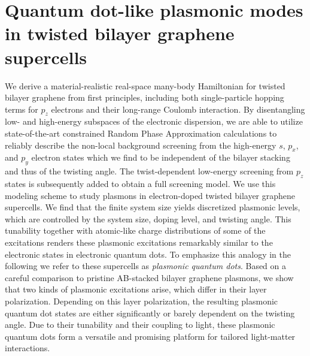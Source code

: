 \openleft%
\chapter[Quantum dot-like plasmonic modes in twisted bilayer graphene supercells][Quantum dot-like plasmonic modes in twisted bilayer graphene supercells]{Quantum dot-like plasmonic modes in twisted bilayer graphene supercells}\label{ch:mat22}


{\small We derive a material-realistic real-space many-body Hamiltonian for twisted bilayer graphene from first principles, including both single-particle hopping terms for $p_z$ electrons and their long-range Coulomb interaction. By disentangling low- and high-energy subspaces of the electronic dispersion, we are able to utilize state-of-the-art constrained Random Phase Approximation calculations to reliably describe the non-local background screening from the high-energy $s$, $p_x$, and $p_y$ electron states which we find to be independent of the bilayer stacking and thus of the twisting angle. The twist-dependent low-energy screening from $p_z$ states is subsequently added to obtain a full screening model.  We use this modeling scheme to study plasmons in electron-doped twisted bilayer graphene supercells. We find that the finite system size yields discretized plasmonic levels, which are controlled by the system size, doping level, and twisting angle. This tunability together with atomic-like charge distributions of some of the excitations renders these plasmonic excitations remarkably similar to the electronic states in electronic quantum dots. To emphasize this analogy in the following we refer to these supercells as \emph{plasmonic quantum dots}.  Based on a careful comparison to pristine AB-stacked bilayer graphene plasmons, we show that two kinds of plasmonic excitations arise, which differ in their layer polarization. Depending on this layer polarization, the resulting plasmonic quantum dot states are either significantly or barely dependent on the twisting angle. Due to their tunability and their coupling to light, these plasmonic quantum dots form a versatile and promising platform for tailored light-matter interactions.}

